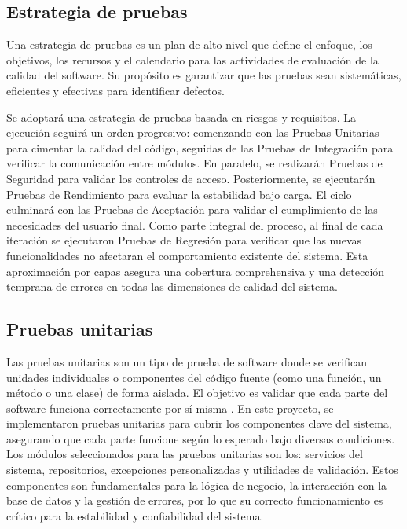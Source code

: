 \subsection{Estrategia de pruebas}

Una estrategia de pruebas es un plan de alto nivel que define el enfoque, los objetivos, los recursos y el
calendario para las actividades de evaluación de la calidad del software. Su propósito es garantizar que las
pruebas sean sistemáticas, eficientes y efectivas para identificar defectos. \citep{garcia2023}

Se adoptará una estrategia de pruebas basada en riesgos y requisitos. La ejecución seguirá un orden
progresivo: comenzando con las Pruebas Unitarias para cimentar la calidad del código, seguidas de las
Pruebas de Integración para verificar la comunicación entre módulos. En paralelo, se realizarán Pruebas
de Seguridad para validar los controles de acceso. Posteriormente, se ejecutarán Pruebas de Rendimiento
para evaluar la estabilidad bajo carga. El ciclo culminará con las Pruebas de Aceptación para validar el cumplimiento de
las necesidades del usuario final. Como parte integral del proceso, al final de cada iteración se ejecutaron
Pruebas de Regresión para verificar que las nuevas funcionalidades no afectaran el comportamiento existente
del sistema. Esta aproximación por capas asegura una cobertura comprehensiva y una detección temprana
de errores en todas las dimensiones de calidad del sistema.

\subsection{Pruebas unitarias}

Las pruebas unitarias son un tipo de prueba de software donde se verifican unidades individuales o
componentes del código fuente (como una función, un método o una clase) de forma aislada. El objetivo es
validar que cada parte del software funciona correctamente por sí misma \citep{bedoyaAlzate2021}. En este
proyecto, se implementaron pruebas unitarias para cubrir los componentes clave del sistema, asegurando que
cada parte funcione según lo esperado bajo diversas condiciones. Los módulos seleccionados para las pruebas unitarias
son los: servicios del sistema, repositorios, excepciones personalizadas y utilidades de validación. 
Estos componentes son fundamentales para la lógica de negocio, la interacción con la base de datos y 
la gestión de errores, por lo que su correcto funcionamiento es crítico para la estabilidad y confiabilidad 
del sistema.

